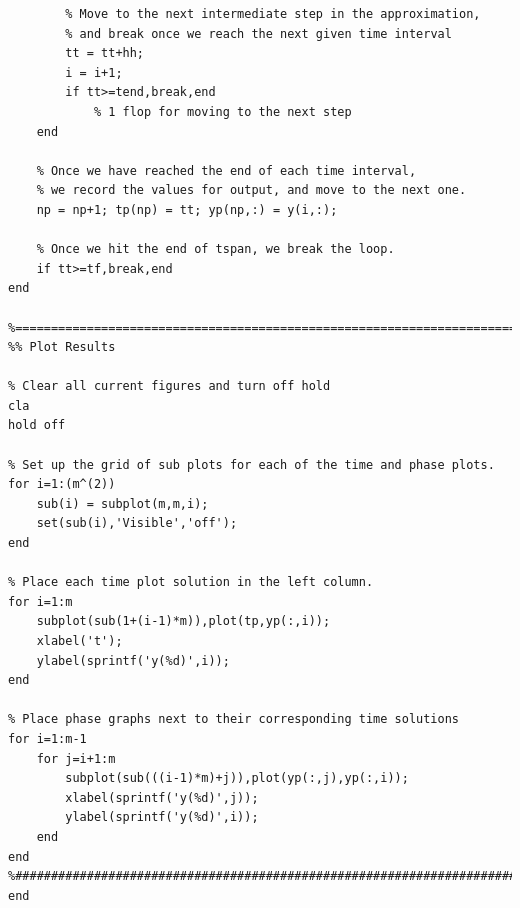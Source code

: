 \documentclass{article}
\begin{document}
\begin{lstlisting}
        % Move to the next intermediate step in the approximation,
        % and break once we reach the next given time interval
        tt = tt+hh;
        i = i+1;
        if tt>=tend,break,end
            % 1 flop for moving to the next step
    end
    
    % Once we have reached the end of each time interval,
    % we record the values for output, and move to the next one.
    np = np+1; tp(np) = tt; yp(np,:) = y(i,:);
    
    % Once we hit the end of tspan, we break the loop.
    if tt>=tf,break,end
end

%==========================================================================
%% Plot Results

% Clear all current figures and turn off hold
cla
hold off

% Set up the grid of sub plots for each of the time and phase plots.
for i=1:(m^(2))
    sub(i) = subplot(m,m,i);
    set(sub(i),'Visible','off');
end

% Place each time plot solution in the left column.
for i=1:m
    subplot(sub(1+(i-1)*m)),plot(tp,yp(:,i));
    xlabel('t');
    ylabel(sprintf('y(%d)',i));
end

% Place phase graphs next to their corresponding time solutions
for i=1:m-1
    for j=i+1:m
        subplot(sub(((i-1)*m)+j)),plot(yp(:,j),yp(:,i));
        xlabel(sprintf('y(%d)',j));
        ylabel(sprintf('y(%d)',i));
    end
end
%##########################################################################
end
\end{lstlisting}
\end{document}
